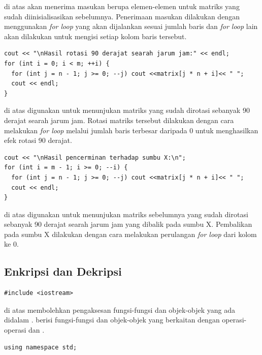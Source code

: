 \documentclass{subfiles}
\begin{document}
{\Script} di atas akan menerima masukan berupa elemen-elemen untuk matriks yang sudah diinisialisasikan sebelumnya. Penerimaan masukan dilakukan dengan menggunakan \textit{for loop} yang akan dijalankan sesuai jumlah baris dan \textit{for loop} lain akan dilakukan untuk mengisi setiap kolom baris tersebut.

\begin{code}
\begin{verbatim}
cout << "\nHasil rotasi 90 derajat searah jarum jam:" << endl;
for (int i = 0; i < m; ++i) {
  for (int j = n - 1; j >= 0; --j) cout <<matrix[j * n + i]<< " ";
  cout << endl; 
}
\end{verbatim}
\end{code}

{\Script} di atas digunakan untuk menunjukan matriks yang sudah dirotasi sebanyak 90 derajat searah jarum jam. Rotasi matriks tersebut dilakukan dengan cara melakukan \textit{for loop} melalui jumlah baris terbesar daripada 0 untuk menghasilkan efek rotasi 90 derajat.

\begin{code}
\begin{verbatim}
cout << "\nHasil pencerminan terhadap sumbu X:\n";
for (int i = m - 1; i >= 0; --i) {
  for (int j = n - 1; j >= 0; --j) cout <<matrix[j * n + i]<< " ";
  cout << endl;
}
\end{verbatim}
\end{code}

{\Script} di atas digunakan untuk menunjukan matriks sebelumnya yang sudah dirotasi sebanyak 90 derajat searah jarum jam yang dibalik pada sumbu X. Pembalikan pada sumbu X dilakukan dengan cara melakukan perulangan \textit{for loop} dari kolom ke 0.

\subsection{Enkripsi dan Dekripsi}
\begin{code}
\begin{verbatim}
#include <iostream>
\end{verbatim}
\end{code}

{\Script} di atas membolehkan pengaksesan fungsi-fungsi dan objek-objek yang ada didalam {\header} {\file} . {\Header} {\file}  berisi fungsi-fungsi dan objek-objek yang berkaitan dengan operasi-operasi {\ioi} dan {\ioo} {\stream}.

\begin{code}
\begin{verbatim}
using namespace std;
\end{verbatim}
\end{code}
\end{document}
